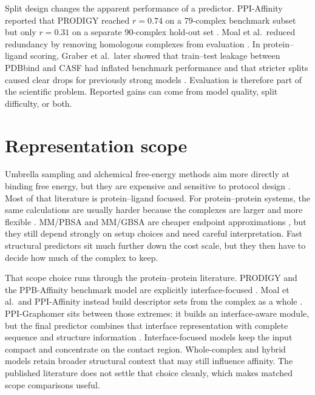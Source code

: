 Split design changes the apparent performance of a predictor. PPI-Affinity reported that PRODIGY reached $r=0.74$ on a 79-complex benchmark subset but only $r=0.31$ on a separate 90-complex hold-out set \citep{RomeroMolina2022PPIAffinity}. Moal et al.\ reduced redundancy by removing homologous complexes from evaluation \citep{Moal2011AffinityPrediction}. In protein--ligand scoring, Graber et al.\ later showed that train--test leakage between PDBbind and CASF had inflated benchmark performance and that stricter splits caused clear drops for previously strong models \citep{Graber2025DataBias}. Evaluation is therefore part of the scientific problem. Reported gains can come from model quality, split difficulty, or both.

\section{Representation scope}

Umbrella sampling and alchemical free-energy methods aim more directly at binding free energy, but they are expensive and sensitive to protocol design \citep{Torrie1977Umbrella,Cournia2017RBFE}. Most of that literature is protein--ligand focused. For protein--protein systems, the same calculations are usually harder because the complexes are larger and more flexible \citep{Siebenmorgen2020PPIReview}. MM/PBSA and MM/GBSA are cheaper endpoint approximations \citep{Massova2000MMPBSA}, but they still depend strongly on setup choices and need careful interpretation. Fast structural predictors sit much further down the cost scale, but they then have to decide how much of the complex to keep.

That scope choice runs through the protein--protein literature. PRODIGY and the PPB-Affinity benchmark model are explicitly interface-focused \citep{Vangone2015Contacts,Liu2024PPBAffinity}. Moal et al.\ and PPI-Affinity instead build descriptor sets from the complex as a whole \citep{Moal2011AffinityPrediction,RomeroMolina2022PPIAffinity}. PPI-Graphomer sits between those extremes: it builds an interface-aware module, but the final predictor combines that interface representation with complete sequence and structure information \citep{Xie2025PPIGraphomer}. Interface-focused models keep the input compact and concentrate on the contact region. Whole-complex and hybrid models retain broader structural context that may still influence affinity. The published literature does not settle that choice cleanly, which makes matched scope comparisons useful.


